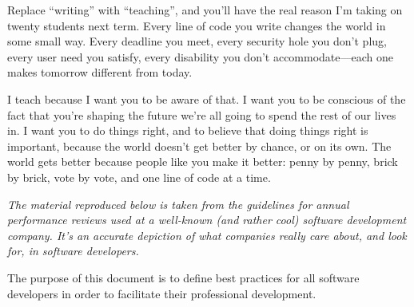 \documentclass{report}
\begin{document}
Replace ``writing'' with ``teaching'', and you'll have the real reason
I'm taking on twenty students next term.  Every line of code you write
changes the world in some small way.  Every deadline you meet, every
security hole you don't plug, every user need you satisfy, every
disability you don't accommodate---each one makes tomorrow different
from today.

I teach because I want you to be aware of that.  I want you to be
conscious of the fact that you're shaping the future we're all going
to spend the rest of our lives in.  I want you to do things right, and
to believe that doing things right is important, because the world
doesn't get better by chance, or on its own.  The world gets better
because people like you make it better: penny by penny, brick by
brick, vote by vote, and one line of code at a time.




\appendix


\emph{The material reproduced below is taken from the guidelines for
annual performance reviews used at a well-known (and rather cool)
software development company.  It's an accurate depiction of what
companies really care about, and look for, in software developers.}

The purpose of this document is to define best practices for all
software developers in order to facilitate their professional
development.
\end{document}
